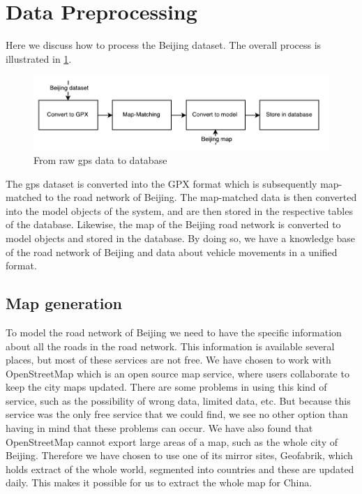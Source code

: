 \section{Data Preprocessing}
Here we discuss how to process the Beijing dataset. The overall process is illustrated in \ref{fig:data-processing}. 
\begin{figure}[h!]
  \centering
    \includegraphics[width=1\textwidth]{figures/data-processing.pdf}
    \caption{From raw gps data to database}
    \label{fig:data-processing}
\end{figure}
The gps dataset is converted into the GPX format which is subsequently map-matched to the road network of Beijing. The map-matched data is then converted into the model objects of the system, and are then stored in the respective tables of the database. Likewise, the map of the Beijing road network is converted to model objects and stored in the database. By doing so, we have a knowledge base of the road network of Beijing and data about vehicle movements in a unified format. 
\subsection{Map generation}
To model the road network of Beijing we need to have the specific information about all the roads in the road network. This information is available several places, but most of these services are not free. We have chosen to work with OpenStreetMap which is an open source map service, where users collaborate to keep the city maps updated. There are some problems in using this kind of service, such as the possibility of wrong data, limited data, etc. But because this service was the only free service that we could find, we see no other option than having in mind that these problems can occur. We have also found that OpenStreetMap cannot export large areas of a map, such as the whole city of Beijing. Therefore we have chosen to use one of its mirror sites, Geofabrik, which holds extract of the whole world, segmented into countries and these are updated daily. This makes it possible for us to extract the whole map for China.

